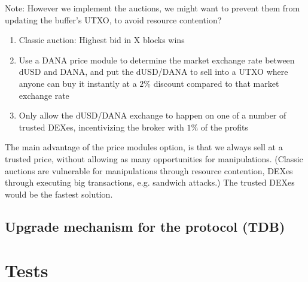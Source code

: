 \documentclass{article} %
\begin{document}
Note: However we implement the auctions, we might want to prevent them from
updating the buffer's UTXO, to avoid resource contention? \\


\begin{enumerate}
  \item Classic auction: Highest bid in X blocks wins
  \item Use a DANA price module to determine the market exchange rate between
    dUSD and DANA, and put the dUSD/DANA to sell into a UTXO where anyone can
    buy it instantly at a $2\%$ discount compared to that market exchange rate
  \item Only allow the dUSD/DANA exchange to happen on one of a number of
    trusted DEXes, incentivizing the broker with $1\%$ of the profits
\end{enumerate}

The main advantage of the price modules option, is that we always sell at a
trusted price, without allowing as many opportunities for manipulations.
(Classic auctions are vulnerable for manipulations through resource contention,
DEXes through executing big transactions, e.g. sandwich attacks.)
The trusted DEXes would be the fastest solution.

\subsection{Upgrade mechanism for the protocol (TDB)}


\section{Tests}


% 
\end{document}
